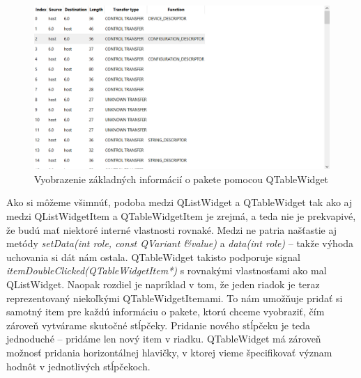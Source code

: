 \begin{figure}[!htb]
	\centering
	\includegraphics[width=\textwidth]{img/kap03_TableViewLook}
	\caption{Vyobrazenie základných informácií o pakete pomocou QTableWidget}
	\label{obr:kap3:TableViewLook}
\end{figure}

Ako si môžeme všimnúť, podoba medzi QListWidget a QTableWidget tak ako aj medzi QListWidgetItem a QTableWidgetItem je zrejmá, a teda nie je prekvapivé, že budú mať niektoré interné vlastnosti rovnaké. Medzi ne patria našťastie aj metódy \textit{setData(int role, const QVariant \&value)} a \textit{data(int role)} -- takže výhoda uchovania si dát nám ostala. QTableWidget takisto podporuje signal  \textit{itemDoubleClicked(QTableWidgetItem*)} s rovnakými vlastnosťami ako mal QListWidget. Naopak rozdiel je napríklad v tom, že jeden riadok je teraz reprezentovaný niekoľkými QTableWidgetItemami. To nám umožňuje pridať si samotný item pre každú informáciu o pakete, ktorú chceme vyobraziť, čím zároveň vytvárame skutočné stĺpčeky. Pridanie nového stĺpčeku je teda jednoduché -- pridáme len nový item v riadku. QTableWidget má zároveň možnosť pridania horizontálnej hlavičky, v ktorej vieme špecifikovať význam hodnôt v jednotlivých stĺpčekoch. 

